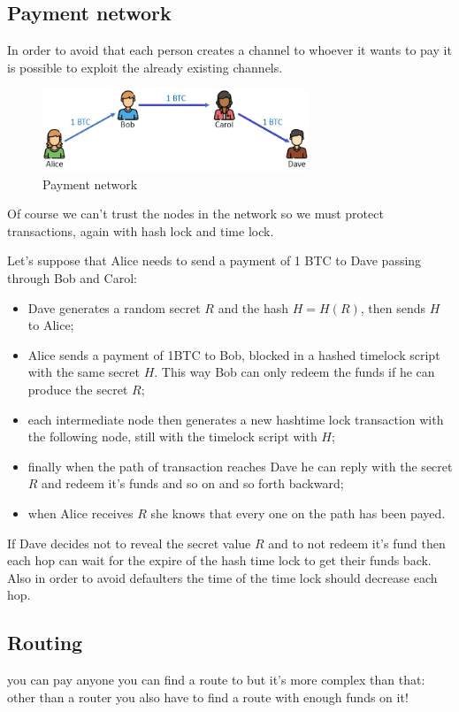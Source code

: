 \subsection{Payment network}
In order to avoid that each person creates a channel to whoever it wants to pay it is possible to exploit the already existing channels.
\begin{figure}[H]
    \centering
    \includegraphics[width=300px]{images/10_Scaling_blockchain/05.png}
    \caption{Payment network}
\end{figure}
Of course we can't trust the nodes in the network so we must protect transactions, again with hash lock and time lock.

Let's suppose that Alice needs to send a payment of 1 BTC to Dave passing through Bob and Carol:
\begin{itemize}
    \item Dave generates a random secret $R$ and the hash $H = H(R)$, then sends $H$ to Alice;
    \item Alice sends a payment of 1BTC to Bob, blocked in a hashed timelock script with the same secret $H$.
    This way Bob can only redeem the funds if he can produce the secret $R$;
    \item each intermediate node then generates a new hashtime lock transaction with the following node, still with the timelock script with $H$;
    \item finally when the path of transaction reaches Dave he can reply with the secret $R$ and redeem it's funds and so on and so forth backward;
    \item when Alice receives $R$ she knows that every one on the path has been payed.
\end{itemize}

If Dave decides not to reveal the secret value $R$ and to not redeem it's fund then each hop can wait for the expire of the hash time lock to get their funds back. 
Also in order to avoid defaulters the time of the time lock should decrease each hop.

\subsection{Routing}
you can pay anyone you can find a route to but it's more complex than that: other than a router you also have to find a route with enough funds on it!

